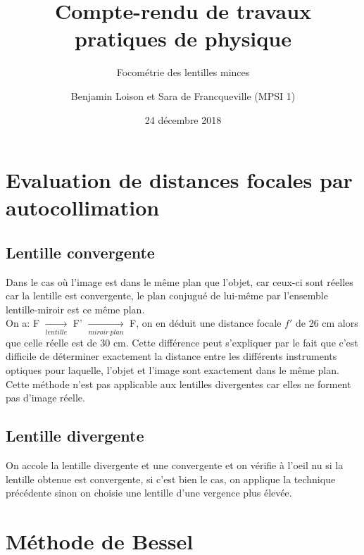 \documentclass{scrartcl}
\begin{document}
	\title{Compte-rendu de travaux pratiques de physique}
	\subtitle{Focométrie des lentilles minces}
	\author{Benjamin Loison et Sara de Francqueville (MPSI 1)}
	\date{24 décembre 2018}
	\maketitle

  \setcounter{section}{1}
	\section{Evaluation de distances focales par autocollimation}

		\subsection{Lentille convergente}

			Dans le cas où l'image est dans le même plan que l'objet, car ceux-ci sont réelles car la lentille est convergente, le plan conjugué de lui-même par l'ensemble lentille-miroir est ce même plan.\\
			On a: F $\xrightarrow[lentille]{}$ F' $\xrightarrow[miroir\ plan]{}$ F, on en déduit une distance focale $f'$ de 26 cm alors que celle réelle est de 30 cm. Cette différence peut s'expliquer par le fait que c'est difficile de déterminer exactement la distance entre les différents instruments optiques pour laquelle, l'objet et l'image sont exactement dans le même plan.\\
			Cette méthode n'est pas applicable aux lentilles divergentes car elles ne forment pas d'image réelle.
			
			\subsection{Lentille divergente}

			On accole la lentille divergente et une convergente et on vérifie à l'oeil nu si la lentille obtenue est convergente, si c'est bien le cas, on applique la technique précédente sinon on choisie une lentille d'une vergence plus élevée.

	\section{Méthode de Bessel}
	
\end{document}
